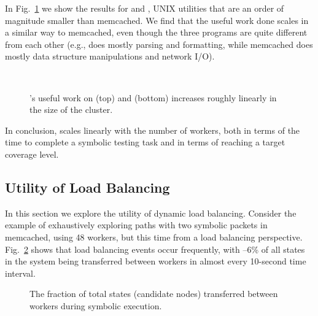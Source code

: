 
In Fig.~\ref{fig:scalab} we show the results for  and , UNIX utilities that are an order of magnitude smaller than memcached. We find that the useful work done scales in a similar way to memcached, even though the three programs are quite different from each other (e.g.,  does mostly parsing and formatting, while memcached does mostly data structure manipulations and network I/O).


\begin{figure}[h!]
  \centering
   \\
  \caption{\cnine's useful work on  (top) and  (bottom) increases roughly linearly in the size of the cluster.}  
  \label{fig:scalab}
\end{figure}

In conclusion, \cnine scales linearly with the number of workers, both in terms of the time to complete a symbolic testing task and in terms of reaching a target coverage level.  %

\subsection{Utility of Load Balancing}
\label{sec:profiling}
 
In this section we explore the utility of dynamic load balancing.  Consider the example of exhaustively exploring paths with two symbolic packets in memcached, using 48 workers, but this time from a load balancing perspective. Fig.~\ref{fig:scalab-load-balancing} shows that load balancing events occur frequently, with --6\% of all states in the system being transferred between workers in almost every 10-second time interval.

\begin{figure}[h!]
  \centering
  \caption{The fraction of total states (candidate nodes) transferred between workers during symbolic execution.}
  \label{fig:scalab-load-balancing}
\end{figure} 

